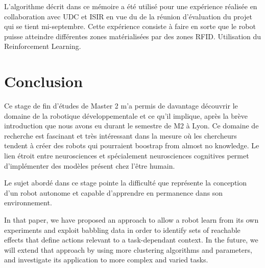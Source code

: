 \documentclass{llncs}
\begin{document}
L'algorithme décrit dans ce mémoire a été utilisé pour une expérience réalisée en collaboration avec UDC et ISIR en vue du de la réunion d'évaluation du projet qui se tient mi-septembre. Cette expérience consiste à faire en sorte que le robot puisse atteindre différentes zones matérialisées par des zones RFID. Utilisation du Reinforcement Learning.






\section{Conclusion}

Ce stage de fin d'études de Master 2 m'a permis de davantage découvrir le domaine de la robotique développementale et ce qu'il implique, après la brève introduction que nous avons eu durant le semestre de M2 à Lyon. Ce domaine de recherche est fascinant et très intéressant dans la mesure où les chercheurs tendent à créer des robots qui pourraient boostrap from almost no knowledge. Le lien étroit entre neurosciences et spécialement neurosciences cognitives permet d'implémenter des modèles présent chez l'être humain.

Le sujet abordé dans ce stage pointe la difficulté que représente la conception d'un robot autonome et capable d'apprendre en permanence dans son environnement.

In that paper, we have proposed an approach to allow a robot learn from its own experiments and exploit babbling data in order to identify sets of reachable effects that define actions relevant to a task-dependant context. In the future, we will extend that approach by using more clustering algorithms and parameters, and investigate its application to more complex and varied tasks.


\end{document}
